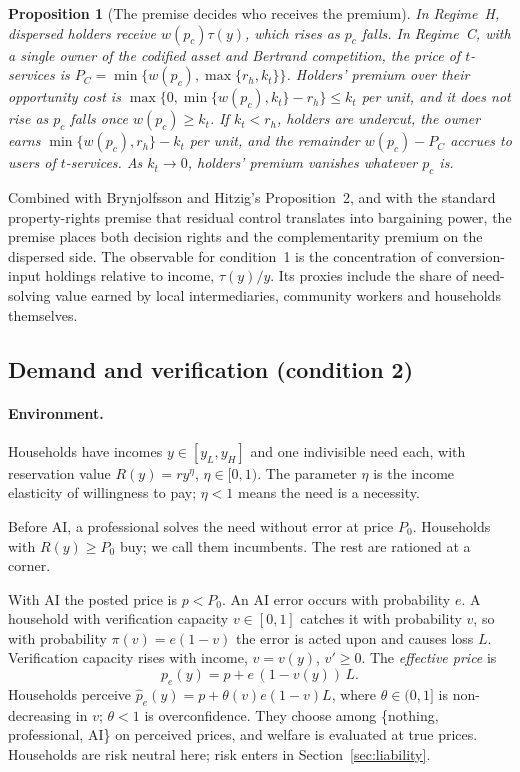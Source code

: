 \documentclass[12pt]{article}
\newtheorem{proposition}{Proposition}
\theoremstyle{remark}
\begin{document}
\begin{proposition}[The premise decides who receives the premium]\label{prop:regime}
In Regime~H, dispersed holders receive $w(p_c)\tau(y)$, which rises as $p_c$ falls. In Regime~C, with a single owner of the codified asset and Bertrand competition, the price of $t$-services is $P_C=\min\{w(p_c),\max\{r_h,k_t\}\}$. Holders' premium over their opportunity cost is $\max\{0,\min\{w(p_c),k_t\}-r_h\}\le k_t$ per unit, and it does not rise as $p_c$ falls once $w(p_c)\ge k_t$. If $k_t<r_h$, holders are undercut, the owner earns $\min\{w(p_c),r_h\}-k_t$ per unit, and the remainder $w(p_c)-P_C$ accrues to users of $t$-services. As $k_t\to0$, holders' premium vanishes whatever $p_c$ is.
\end{proposition}

Combined with Brynjolfsson and Hitzig's Proposition~2, and with the standard property-rights premise that residual control translates into bargaining power, the premise places both decision rights and the complementarity premium on the dispersed side. The observable for condition~1 is the concentration of conversion-input holdings relative to income, $\tau(y)/y$. Its proxies include the share of need-solving value earned by local intermediaries, community workers and households themselves.

\subsection{Demand and verification (condition 2)}\label{sec:verification}

\paragraph{Environment.} Households have incomes $y\in[y_L,y_H]$ and one indivisible need each, with reservation value $R(y)=ry^\eta$, $\eta\in[0,1)$. The parameter $\eta$ is the income elasticity of willingness to pay; $\eta<1$ means the need is a necessity.

Before AI, a professional solves the need without error at price $P_0$. Households with $R(y)\ge P_0$ buy; we call them incumbents. The rest are rationed at a corner.

With AI the posted price is $p<P_0$. An AI error occurs with probability $e$. A household with verification capacity $v\in[0,1]$ catches it with probability $v$, so with probability $\pi(v)=e(1-v)$ the error is acted upon and causes loss $L$. Verification capacity rises with income, $v=v(y)$, $v'\ge0$. The \emph{effective price} is
\begin{equation}
p_e(y)=p+e\,(1-v(y))\,L .
\end{equation}
Households perceive $\hat p_e(y)=p+\theta(v)e(1-v)L$, where $\theta\in(0,1]$ is non-decreasing in $v$; $\theta<1$ is overconfidence. They choose among \{nothing, professional, AI\} on perceived prices, and welfare is evaluated at true prices. Households are risk neutral here; risk enters in Section~\ref{sec:liability}.
\end{document}
